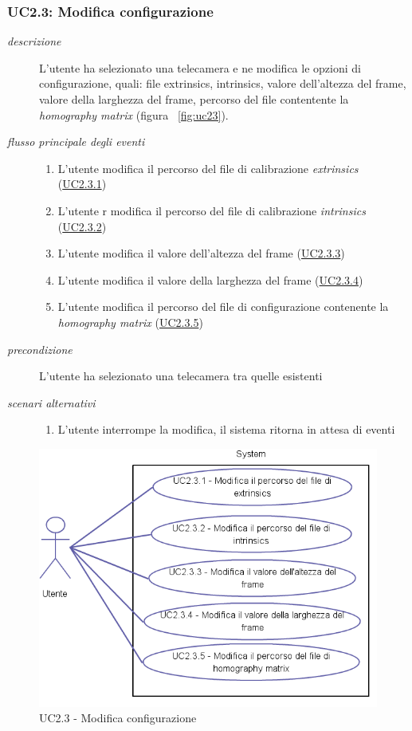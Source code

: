 \subsubsection{UC2.3: Modifica configurazione} \label{sec:UC2.3}
\begin{description}
\item[\em{descrizione }]L'utente ha selezionato una telecamera e ne modifica le opzioni di configurazione, quali: file extrinsics, intrinsics, valore dell'altezza del frame, valore della larghezza del frame, percorso del file contentente la \textit{homography matrix} (figura ~\ref{fig:uc23}).
\item[\em{flusso principale degli eventi }] \mbox{}
\begin{enumerate}
\item L'utente modifica il percorso del file di calibrazione \textit{extrinsics} (\hyperref[sec:uc2.3.1]{UC2.3.1})
\item L'utente r modifica il percorso del file di calibrazione \textit{intrinsics} (\hyperref[sec:uc2.3.2]{UC2.3.2})
\item L'utente modifica il valore dell'altezza del frame (\hyperref[sec:uc2.3.3]{UC2.3.3})
\item L'utente modifica il valore della larghezza del frame (\hyperref[sec:uc2.3.4]{UC2.3.4})
\item L'utente modifica il percorso del file di configurazione contenente la \textit{homography matrix} (\hyperref[sec:uc2.3.5]{UC2.3.5})
\end{enumerate}
\item[\em{precondizione }] L'utente ha selezionato una telecamera tra quelle esistenti
\item[\em{scenari alternativi }] \mbox{} 
\begin{enumerate} 
\item L'utente interrompe la modifica, il sistema ritorna in attesa di eventi
\end{enumerate}
\end{description}

\begin{figure}[htpb] 
\centering 
\includegraphics[scale=0.4]{./images/uc23.png} 
\caption{UC2.3 - Modifica configurazione} 
\label{fig:uc2.3}
\end{figure} 

